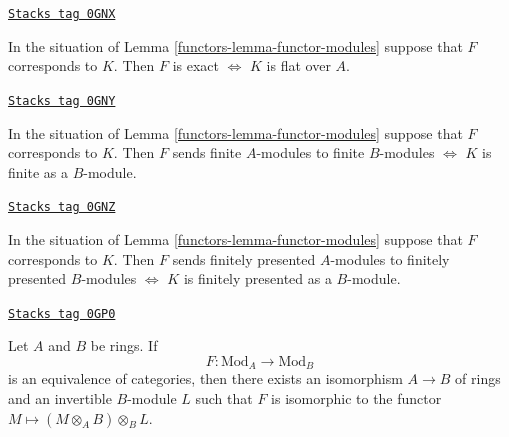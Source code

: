 \begin{remark}
\label{functors-remark-exact-flat}
\href{https://stacks.math.columbia.edu/tag/0GNX}{\texttt{Stacks tag 0GNX}}

In the situation of Lemma \ref{functors-lemma-functor-modules}
suppose that $F$ corresponds to $K$. Then
$F$ is exact $\Leftrightarrow$ $K$ is flat over $A$.
\end{remark}

\begin{remark}[Finite]
\label{functors-remark-finite}
\href{https://stacks.math.columbia.edu/tag/0GNY}{\texttt{Stacks tag 0GNY}}

In the situation of Lemma \ref{functors-lemma-functor-modules}
suppose that $F$ corresponds to $K$. Then
$F$ sends finite $A$-modules to finite $B$-modules
$\Leftrightarrow$ $K$ is finite as a $B$-module.
\end{remark}

\begin{remark}
\label{functors-remark-finite-presentation}
\href{https://stacks.math.columbia.edu/tag/0GNZ}{\texttt{Stacks tag 0GNZ}}

In the situation of Lemma \ref{functors-lemma-functor-modules}
suppose that $F$ corresponds to $K$. Then
$F$ sends finitely presented $A$-modules to finitely presented $B$-modules
$\Leftrightarrow$ $K$ is finitely presented as a $B$-module.
\end{remark}

\begin{lemma}
\label{functors-lemma-functor-equivalence}
\href{https://stacks.math.columbia.edu/tag/0GP0}{\texttt{Stacks tag 0GP0}}

Let $A$ and $B$ be rings. If
$$
F : \text{Mod}_A \longrightarrow \text{Mod}_B
$$
is an equivalence of categories, then there exists an isomorphism
$A \to B$ of rings and an invertible $B$-module $L$ such that
$F$ is isomorphic to the functor $M \mapsto (M \otimes_A B) \otimes_B L$.
\end{lemma}

